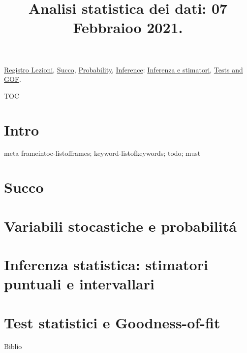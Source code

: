 \documentclass[t,10pt,xcolor={usenames},fleqn]{beamer}
\title{Analisi statistica dei dati: 07 Febbraioo 2021.}
\begin{document}
\setcounter{tocdepth}{2}

\begin{frame}
  \titlepage
  \hyperlink{reg}{Registro Lezioni}, \hyperlink{succo}{Succo}, \hyperlink{statdistro}{Probability}, \hyperlink{inference}{Inference}: \hyperlink{inferenceparadigm}{Inferenza e stimatori}, \hyperlink{testgof}{Tests and GOF}.
\end{frame}

\begin{frame}{TOC}
\tableofcontents[onlyparts]
\listofframes
\end{frame}

\part{Intro}%
\begin{frame}{meta}
frameintoc-listofframes; keyword-listofkeywords; todo; must
\end{frame}



\part{Succo}%


\part{Variabili stocastiche e probabilit\'a}%


\part{Inferenza statistica: stimatori puntuali e intervallari}%


\part{Test statistici e Goodness-of-fit}%


\begin{frame}{Biblio}
    \printbibliography
\end{frame}
\end{document}
